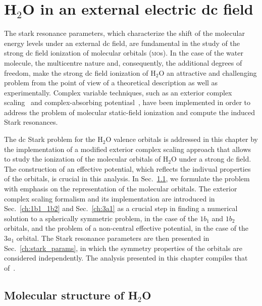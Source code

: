 \chapter{H$_{2}$O in an external electric dc field}
\label{cha:dc_h2o}


The stark resonance parameters, which characterize the shift of the
molecular energy levels under an external dc field, are fundamental in
the study of the strong dc field ionization of molecular orbitals
(\textsc{mo}s). In the case of the water molecule, the multicentre
nature and, consequently, the additional degrees of freedom, make the
strong dc field ionization of H$_{2}$O an attractive and challenging
problem from the point of view of a theoretical description as well as
experimentally. Complex variable techniques, such as an exterior
complex scaling~\cite{Simon_1979,Scrinzi_2010} and complex-absorbing
potentiasl~\cite{RissMeyer_1993,Krause_2014}, have been implemented in
order to address the problem of molecular static-field ionization and
compute the induced Stark resonances.

The dc Stark problem for the H$_{2}$O valence orbitals is addressed in
this chapter by the implementation of a modified exterior complex
scaling approach that allows to study the ionization of the molecular
orbitals of H$_{2}$O under a strong dc field. The construction of an
effective potential, which reflects the indivual properties of the
orbitals, is crucial in this analysis. In Sec.~\ref{ch:h2o_structure},
we formulate the problem with emphasis on the representation of the
molecular orbitals. The exterior complex scaling formalism and its
implementation are introduced in Sec.~\ref{ch:1b1_1b2} and
Sec.~\ref{ch:3a1} as a crucial step in finding a numerical solution to
a spherically symmetric problem, in the case of the $1b_{1}$ and
$1b_{2}$ orbitals, and the problem of a non-central effective
potential, in the case of the $3a_{1}$ orbital. The Stark resonance
parameters are then presented in Sec.~\ref{ch:stark_params}, in which
the symmetry properties of the orbitals are considered
independently. The analysis presented in this chapter compiles that
of~\cite{sarias_2016,sarias_2017}.


\section{Molecular structure of H$_{2}$O}
\label{ch:h2o_structure}

